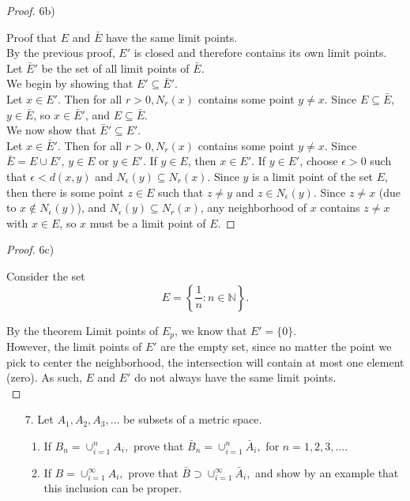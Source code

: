 \documentclass[10pt]{article}
\theoremstyle{definition}
\theoremstyle{plain}
\newcommand{\N}{\mathbb{N}}
\begin{document}
\begin{proof}
6b)

Proof that $E$ and $\bar{E}$ have the same limit points. \\

By the previous proof, $E'$ is closed and therefore contains its own limit points. \\

Let $\bar{E}'$ be the set of all limit points of $\bar{E}$. \\

We begin by showing that $E'\subseteq \bar{E}'$. \\

Let $x\in E'$. Then for all $r>0, N_r(x)$ contains some point $y\neq x$. Since $E\subseteq\bar{E}$, $y\in\bar{E}$, so $x\in\bar{E}'$, and $E\subseteq\bar{E}$. \\

We now show that $\bar{E}'\subseteq E'$. \\

Let $x\in\bar{E}'$. Then for all $r>0, N_r(x)$ contains some point $y\neq x$. Since $\bar{E} = E\cup E'$, $y\in E$ or $y\in E'$. If $y\in E$, then $x\in E'$. If $y\in E'$, choose $\epsilon>0$ such that $\epsilon < d(x,y)$ and $N_\epsilon(y) \subseteq N_r(x)$. Since $y$ is a limit point of the set $E$, then there is some point $z\in E$ such that $z\neq y$ and $z\in N_\epsilon(y)$. Since $z\neq x$ (due to $x\not\in N_\epsilon(y)$), and $N_\epsilon(y) \subseteq N_r(x)$, any neighborhood of $x$ contains $z\neq x$ with $x\in E$, so $x$ must be a limit point of $E$.
\end{proof}

\begin{proof}
 6c)

  Consider the set
  $$E = \left\{\frac{1}{n}: n\in\N\right\}.$$

  By the theorem Limit points of $E_p$, we know that $E' = \{0\}$. \\

  However, the limit points of $E'$ are the empty set, since no matter the point we pick to center the neighborhood, the intersection will contain at most one element (zero). As such, $E$ and $E'$ do not always have the same limit points. \\
\end{proof}



\pagebreak



\begin{enumerate}
\item[7.] Let $A_1,A_2,A_3,\dots$ be subsets of a metric space.
\begin{enumerate}
  \item If $B_n = \cup_{i=1}^{n} A_i,$ prove that $\bar{B}_n = \cup_{i=1}^{n} \bar{A}_i,$ for $n=1,2,3,\dots$.
  \item If $B = \cup_{i=1}^{\infty} A_i,$ prove that $\bar{B} \supset \cup_{i=1}^{\infty} \bar{A}_i,$ and show by an example that this inclusion can be proper.
\end{enumerate}

\end{enumerate}
\end{document}
